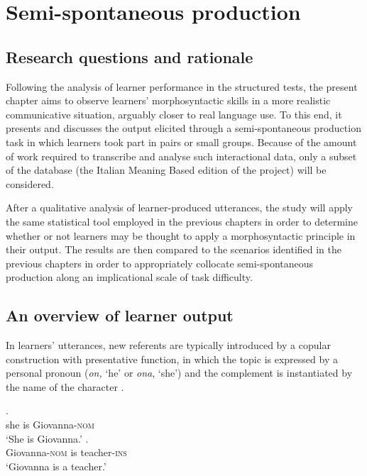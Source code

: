 \chapter{Semi-spontaneous production}\label{sec:6}

\section{Research questions and rationale}\label{sec:07:1}

Following the analysis of learner performance in the structured tests, the present chapter aims to observe learners' morphosyntactic skills in a more realistic communicative situation, arguably closer to real language use. To this end, it presents and discusses the output elicited through a semi-spontaneous production task in which learners took part in pairs or small groups. Because of the amount of work required to transcribe and analyse such interactional data, only a subset of the database (the Italian Meaning Based edition of the project) will be considered.

After a qualitative analysis of learner-produced utterances, the study will apply the same statistical tool employed in the previous chapters in order to determine whether or not learners may be thought to apply a morphosyntactic principle in their output. The results are then compared to the scenarios identified in the previous chapters in order to appropriately collocate semi-spontaneous production along an implicational scale of task difficulty.

\section{An overview of learner output}\label{sec:07:2}

In learners' utterances, new referents are typically introduced by a copular construction with presentative function, in which the topic is expressed by a personal pronoun (\textit{on,} ‘he’ or \textit{ona}, ‘she’) and the complement is instantiated by the name of the character .

\ea%
    \label{ex:07:1}
    \ea\label{ex:07:1a}
    .\\
            \hspaceThis{[}she  is  Giovanna-\textsc{nom}\\
    \glt    ‘She is Giovanna.’
    \ex\label{ex:07:1b}
    .  \\
            \hspaceThis{[}Giovanna-\textsc{nom}  is  teacher-\textsc{ins}\\
    \glt    ‘Giovanna is a teacher.’
    \z
\z

